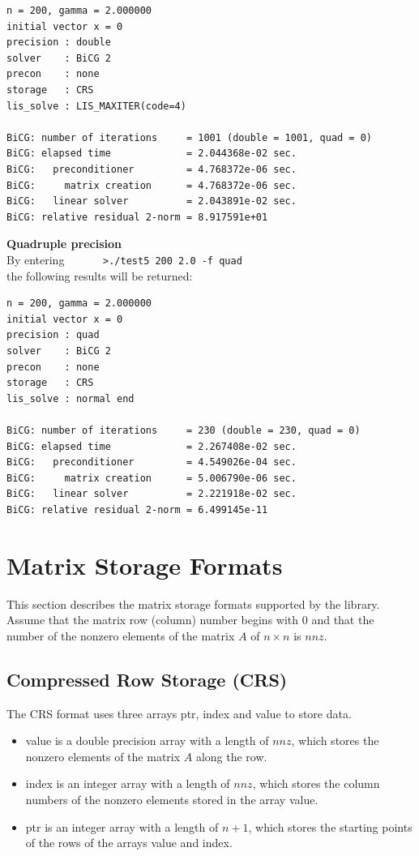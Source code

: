 \documentclass[a4paper]{article}
\begin{document}
\begin{verbatim}
n = 200, gamma = 2.000000
initial vector x = 0
precision : double
solver    : BiCG 2
precon    : none
storage   : CRS
lis_solve : LIS_MAXITER(code=4)

BiCG: number of iterations     = 1001 (double = 1001, quad = 0)
BiCG: elapsed time             = 2.044368e-02 sec.
BiCG:   preconditioner         = 4.768372e-06 sec. 
BiCG:     matrix creation      = 4.768372e-06 sec.
BiCG:   linear solver          = 2.043891e-02 sec.
BiCG: relative residual 2-norm = 8.917591e+01
\end{verbatim}

\noindent
{\bf Quadruple precision}\\
By entering
\verb+      >./test5 200 2.0 -f quad+\\
the following results will be returned:

\begin{verbatim}
n = 200, gamma = 2.000000
initial vector x = 0
precision : quad
solver    : BiCG 2
precon    : none
storage   : CRS
lis_solve : normal end

BiCG: number of iterations     = 230 (double = 230, quad = 0)
BiCG: elapsed time             = 2.267408e-02 sec.
BiCG:   preconditioner         = 4.549026e-04 sec. 
BiCG:     matrix creation      = 5.006790e-06 sec.
BiCG:   linear solver          = 2.221918e-02 sec.
BiCG: relative residual 2-norm = 6.499145e-11
\end{verbatim}
\newpage
\section{Matrix Storage Formats}
\label{sec:storages}
This section describes the matrix storage formats supported by the library. 
Assume that the matrix row (column) number begins with $0$ and 
that the number of the nonzero elements of the matrix $A$ of $n \times
n$ is $nnz$.

\subsection{Compressed Row Storage (CRS)}
The CRS format uses three arrays {\ttfamily ptr}, {\ttfamily index} and {\ttfamily value} to store data.
\begin{itemize}
\item {\ttfamily value} is a double precision array with a length of
      $nnz$, which stores the nonzero elements of the matrix $A$ along the row.
\item {\ttfamily index} is an integer array with a length of $nnz$,
      which stores the column numbers of the nonzero elements stored in
      the  array {\ttfamily value}.
\item {\ttfamily ptr} is an integer array with a length of $n+1$, which
      stores the starting points of the rows of the arrays {\ttfamily value} and {\ttfamily index}. 
\end{itemize}
\end{document}

